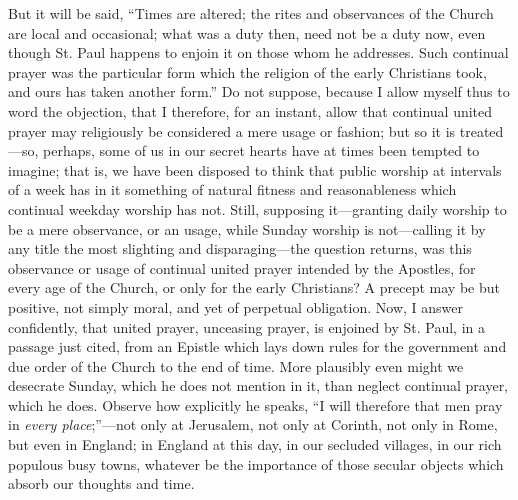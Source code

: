 But it will be said, ``Times are altered; the rites and
observances of the Church are local and occasional; what was a duty
then, need not be a duty now, even though St. Paul happens to enjoin
it on those whom he addresses. Such continual prayer was the
particular form which the religion of the early Christians took, and
ours has taken another form.'' Do not suppose, because I allow
myself thus to word the objection, that I therefore, for an instant,
allow that continual united prayer may religiously be considered a
mere usage or fashion; but so it is treated—so, perhaps, some of us
in our secret hearts have at times been tempted to imagine; that is,
we have been disposed to think that public worship at intervals of a
week has in it something of natural fitness and reasonableness which
continual weekday worship has not. Still, supposing it—granting
daily worship to be a mere observance, or an usage, while Sunday
worship is not—calling it by any title the most slighting and
disparaging—the question returns, was this observance or usage of
continual united prayer intended by the Apostles, for every age of the
Church, or only for the early Christians? A precept may be but
positive, not simply moral, and yet of perpetual obligation. Now, I
answer confidently, that united prayer, unceasing prayer, is enjoined
by St. Paul, in a passage just cited, from an Epistle which lays down
rules for the government and due order of the Church to the end of
time. More plausibly even might we desecrate Sunday, which he does not
mention in it, than neglect continual prayer, which he does. Observe
how explicitly he speaks, ``I will therefore that men pray in \emph{every
place};''—not only at Jerusalem, not only at Corinth, not
only in Rome, but even in England; in England at this day, in our
secluded villages, in our rich populous busy towns, whatever be the
importance of those secular objects which absorb our thoughts and
time.

